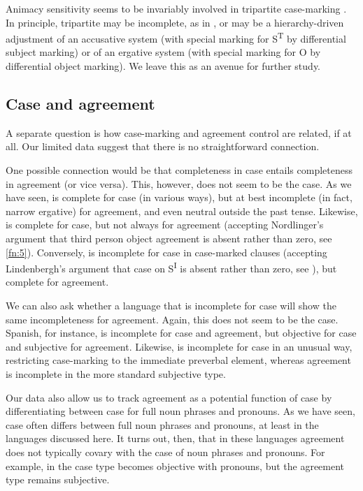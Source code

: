 \documentclass[output=paper]{langsci/langscibook}
\begin{document}
Animacy sensitivity seems to be invariably involved in tripartite case-marking
\citep{Zwart2006a}. In principle, tripartite  may be incomplete,
as in , or may be a hierarchy-driven adjustment of an accusative
system (with special marking for S\textsuperscript{T} by differential subject
marking) or of an ergative system (with special marking for O by differential
object marking).  We leave this as an avenue for further study.

\subsection{Case and agreement}\label{sec:11.5.4}

A separate question is how case-marking and agreement control are related, if
at all. Our limited data suggest that there is no straightforward connection.

One possible connection would be that completeness in case entails completeness
in agreement (or vice versa). This, however, does not seem to be the case. As
we have seen,  is complete for case (in various ways), but
at best incomplete (in fact, narrow ergative) for agreement, and even neutral
outside the past tense. Likewise,  is complete for case, but not
always for agreement (accepting Nordlinger’s argument that third person object
agreement is absent rather than zero, see \cref{fn:5}). Conversely,  is incomplete for case in case-marked clauses (accepting Lindenbergh’s
argument that case on S\textsuperscript{I} is absent rather than zero, see
), but complete for agreement.

We can also ask whether a language that is incomplete for case will show the
same incompleteness for agreement. Again, this does not seem to be the case.
Spanish, for instance, is incomplete for case and agreement, but objective for
case and subjective for agreement. Likewise,  is incomplete for
case in an unusual way, restricting case-marking to the immediate preverbal
element, whereas agreement is incomplete in the more standard subjective
 type.

Our data also allow us to track agreement  as a potential
function of case  by differentiating between case for full noun
phrases and pronouns. As we have seen, case  often differs
between full noun phrases and pronouns, at least in the languages discussed
here. It turns out, then, that in these languages agreement 
does not typically covary with the case  of noun phrases and
pronouns. For example, in  the case  type becomes
objective with pronouns, but the agreement  type remains subjective.
\end{document}
